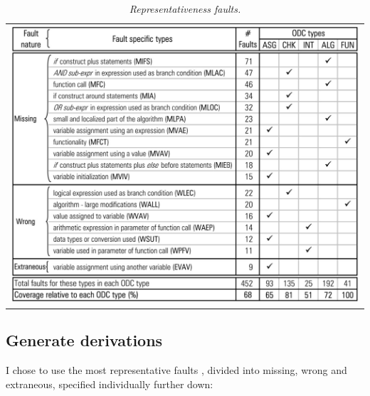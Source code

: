 \begin{table}[ht]
\begin{tabular}{c}
\includegraphics[width=1\textwidth]{img/representative_faults.jpg}
\end{tabular}
\caption{\small \sl Representativeness faults.\label{tab:representative_faults}}
\end{table}

\subsection{Generate derivations}

I chose to use the most representative faults \cite{duraes2006emulation}, divided into missing, wrong and extraneous, specified individually further down:


